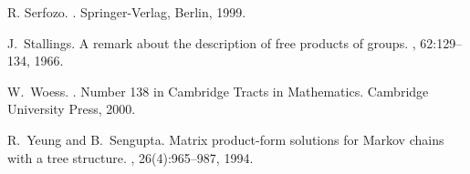 \documentclass[11pt,a4paper]{article}
\theoremstyle{remark}
\begin{document}
\begin{thebibliography}{10}
R. Serfozo.
.
\newblock Springer-Verlag, Berlin, 1999.

J.~Stallings.
\newblock A remark about the description of free products of groups.
, 62:129--134, 1966.

W.~Woess.
.
\newblock Number 138 in Cambridge Tracts in Mathematics. Cambridge University
  Press, 2000.

R.~Yeung and B.~Sengupta.
\newblock Matrix product-form solutions for {M}arkov chains with a tree
  structure.
, 26(4):965--987, 1994.


\end{thebibliography}
\end{document}
